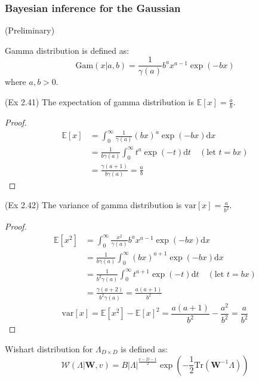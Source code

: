 \subsubsection{Bayesian inference for the Gaussian}
(Preliminary)
\begin{definition}
Gamma distribution is defined as:
\begin{equation}
\text{Gam}(x\vert{}a,b)=\frac{1}{\gamma(a)}b^{a}x^{a-1}\exp{}(-bx)
\end{equation}
where $a,b>0$.
\end{definition}
\begin{conclusion}
(Ex 2.41) The expectation of gamma distribution is $\mathbb{E}[x]=\frac{a}{b}$.
\end{conclusion}
\begin{proof}
\begin{equation}
\begin{split}
\mathbb{E}[x]&=\int_{0}^{\infty}\frac{1}{\gamma(a)}(bx)^{a}\exp{}(-bx)\text{d}x\\
&=\frac{1}{b\gamma(a)}\int_{0}^{\infty}t^{a}\exp{}(-t)\text{d}t\quad{}(\text{let }t=bx)\\
&=\frac{\gamma(a+1)}{b\gamma(a)}=\frac{a}{b}
\end{split}
\end{equation}
\end{proof}
\begin{conclusion}
(Ex 2.42) The variance of gamma distribution is $\text{var}[x]=\frac{a}{b^2}$.
\end{conclusion}
\begin{proof}
\begin{equation}
\begin{split}
\mathbb{E}[x^2]&=\int_{0}^{\infty}\frac{x^2}{\gamma(a)}b^{a}x^{a-1}\exp{}(-bx)\text{d}x\\
&=\frac{1}{b\gamma(a)}\int_{0}^{\infty}(bx)^{a+1}\exp{}(-bx)\text{d}x\\
&=\frac{1}{b^2\gamma(a)}\int_{0}^{\infty}t^{a+1}\exp{}(-t)\text{d}t\quad{}(\text{let }t=bx)\\
&=\frac{\gamma(a+2)}{b^2\gamma(a)}=\frac{a(a+1)}{b^2}
\end{split}
\end{equation}
\begin{equation}
\text{var}[x]=\mathbb{E}[x^2]-\mathbb{E}[x]^2=\frac{a(a+1)}{b^2}-\frac{a^2}{b^2}=\frac{a}{b^2}
\end{equation}
\end{proof}
\begin{definition}
Wishart distribution for $\Lambda_{D\times{}D}$ is defined as:
\begin{equation}
\mathcal{W}(\Lambda\vert\mathbf{W},v)=B\vert\Lambda\vert^{\frac{v-D-1}{2}}\exp{}(-\frac{1}{2}\text{Tr}(\mathbf{W}^{-1}\Lambda))
\end{equation}
\end{definition}
